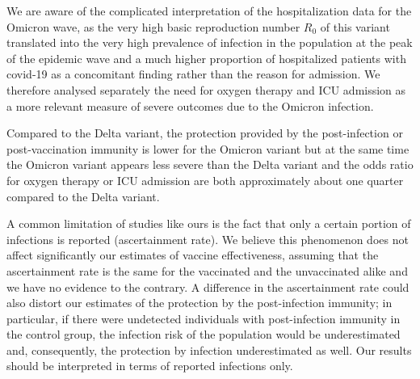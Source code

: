 \documentclass[9pt,twocolumn,twoside,lineno]{pnas-new}
\begin{document}
We are aware of the complicated interpretation of the hospitalization data for the Omicron wave, as the very high basic reproduction number $R_0$ of this variant \cite{nishiura2022relative} translated into the very high prevalence of infection in the population at the peak of the epidemic wave and a much higher proportion of hospitalized patients with covid-19 as a concomitant finding rather than the reason for admission. We therefore analysed separately the need for oxygen therapy and ICU admission as a more relevant measure of severe outcomes due to the Omicron infection.

Compared to the Delta variant, the protection provided by the post-infection or post-vaccination immunity is lower for the Omicron variant but at the same time the Omicron variant appears less severe than the Delta variant and the odds ratio for oxygen therapy or ICU admission are both approximately about one quarter compared to the Delta variant.

A common limitation of studies like ours is the fact that only a certain portion of infections is reported (ascertainment rate).  We believe this phenomenon does not affect significantly our estimates of vaccine effectiveness, assuming that the ascertainment rate is the same for the vaccinated and the unvaccinated alike and we have no evidence to the contrary. A difference in the ascertainment rate could also distort our estimates of the protection by the post-infection immunity; in particular, if there were undetected individuals with post-infection immunity in the control group, the infection risk of the population would be underestimated and, consequently, the protection by infection underestimated as well. Our results should be interpreted in terms of reported infections only. 



\showacknow{} %


\end{document}
